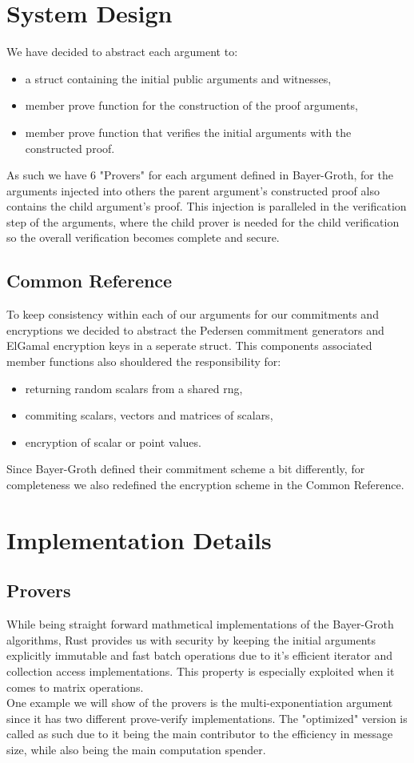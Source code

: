 \documentclass[12pt,a4paper]{report}
\begin{document}
\section{System Design}
We have decided to abstract each argument to:
\begin{itemize}
	\item a struct containing the initial public arguments and witnesses,
	\item member prove function for the construction of the proof arguments,
	\item member prove function that verifies the initial arguments with the constructed proof.
\end{itemize}
As such we have 6 "Provers" for each argument defined in Bayer-Groth, for the arguments injected into others
the parent argument's constructed proof also contains the child argument's proof. This injection is paralleled
in the verification step of the arguments, where the child prover is needed for the child verification
so the overall verification becomes complete and secure.

\subsection{Common Reference}
To keep consistency within each of our arguments for our commitments and encryptions we decided to abstract 
the Pedersen commitment generators and ElGamal encryption keys in a seperate struct. This components associated
member functions also shouldered the responsibility for: 
\begin{itemize}
	\item returning random scalars from a shared rng, 
	\item commiting scalars, vectors and matrices of scalars, 
	\item encryption of scalar or point values.
\end{itemize}
Since Bayer-Groth defined their commitment scheme a bit differently, for completeness we also redefined 
the encryption scheme in the Common Reference.

\section{Implementation Details}
\subsection{Provers}
While being straight forward mathmetical implementations of the Bayer-Groth algorithms, Rust provides us with
security by keeping the initial arguments explicitly immutable and fast batch operations due to it's efficient
iterator and collection access implementations.
This property is especially exploited when it comes to matrix operations.\\
One example we will show of the provers is the multi-exponentiation argument since it has two different prove-verify
implementations. The "optimized" version is called as such due to it being the main contributor to the efficiency in message size,
while also being the main computation spender.
\end{document}
